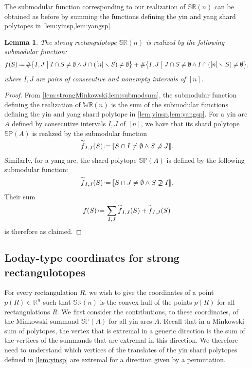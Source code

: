 \documentclass{amsart}
\newtheorem{lemma}[theorem]{Lemma}
\theoremstyle{definition}
\newcommand{\R}{\mathbb{R}} %
\newcommand{\bigset}[2]{\big\{ #1 \;\big|\; #2 \big\}} %
\newcommand{\ssm}{\smallsetminus} %
\newcommand{\eqdef}{\mbox{\,\raisebox{0.2ex}{\scriptsize\ensuremath{\mathrm:}}\ensuremath{=}\,}} %
\newcommand{\jean}[2][]{\todo[size=\scriptsize, color=orange!30,#1]{\rm #2 \\ \hfill --- J.}}
\newcommand{\polytope}[1]{\mathds{#1}} %
\newcommand{\WRP}{\polytope{WR}} %
\newcommand{\SRP}{\polytope{SR}} %
\newcommand{\SP}{\polytope{SP}}
\newcommand{\yang}[1]{\smash{\overset{\backsim}{#1}}}
\newcommand{\yin}[1]{\smash{\overset{\sim}{#1}}}
\begin{document}
\jean{That seems to work.}

The submodular function corresponding to our realization of $\SRP(n)$ can be obtained as before by summing the functions defining the yin and yang shard polytopes in \cref{lem:yinsp,lem:yangsp}.

\begin{lemma}
  The strong rectangulotope $\SRP(n)$ is realized by the following submodular function:
  \[
  f(S) \eqdef \# \bigset{ I, J }{ I\cap S\not=\emptyset \wedge J\cap ([n]\ssm S) \not= \emptyset } +
  \#\bigset{ I, J }{ J\cap S\not=\emptyset \wedge I\cap ([n]\ssm S) \not= \emptyset },
  \]
  where $I, J$ are pairs of consecutive and nonempty intervals of $[n]$.
\end{lemma}

\begin{proof}
  From \cref{lem:strongMinkowski,lem:submodsum}, the submodular function defining the realization of $\WRP(n)$ is the sum of the submodular functions defining the yin and yang shard polytope in \cref{lem:yinsp,lem:yangsp}. For a yin arc $A$ defined by consecutive intervals $I, J$ of $[n]$, we have that its shard polytope $\SP(A)$ is realized by the submodular function
  \[
  \yin{f}_{I,J}(S) \eqdef \llbracket S\cap I\not=\emptyset \wedge S\not\supseteq J \rrbracket .
  \]
  Similarly, for a yang arc, the shard polytope $\SP(A)$ is defined by the following submodular function:
  \[
  \yang{f}_{I,J}(S) \eqdef \llbracket S\cap J\not=\emptyset \wedge S\not\supseteq I \rrbracket .
  \]
  Their sum
  \[
  f(S) \eqdef \sum_{I,J} \yin{f}_{I,J}(S) + \yang{f}_{I,J}(S)
  \]
  is therefore as claimed.
\end{proof}

\subsection{Loday-type coordinates for strong rectangulotopes}

For every rectangulation $R$, we wish to give the coordinates of a point $p(R)\in\R^n$ such that $\SRP(n)$ is the convex hull of the points $p(R)$ for all rectangulations $R$.
We first consider the contributions, to these coordinates, of the Minkowski summand $\SP(A)$ for all yin arcs $A$.
Recall that in a Minkowski sum of polytopes, the vertex that is extremal in a generic direction is the sum of the vertices of the summands that are extremal in this direction.
We therefore need to understand which vertices of the translates of the yin shard polytopes defined in \cref{lem:yinsp} are extremal for a direction given by a permutation.
\end{document}

